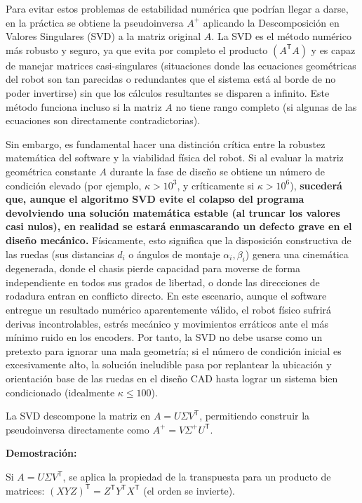 \documentclass[11pt,a4paper]{article}
\newcommand{\trans}{\mathsf{T}}      %
\begin{document}
Para evitar estos problemas de estabilidad numérica que podrían llegar a darse, en la práctica se obtiene la pseudoinversa \(A^+\) aplicando la Descomposición en Valores Singulares (SVD) a la matriz original \(A\). La SVD es el método numérico más robusto y seguro, ya que evita por completo el producto \((A^{\trans}A)\) y es capaz de manejar matrices casi-singulares (situaciones donde las ecuaciones geométricas del robot son tan parecidas o redundantes que el sistema está al borde de no poder invertirse) sin que los cálculos resultantes se disparen a infinito. Este método funciona incluso si la matriz \(A\) no tiene rango completo (si algunas de las ecuaciones son directamente contradictorias).

Sin embargo, es fundamental hacer una distinción crítica entre la robustez matemática del software y la viabilidad física del robot. Si al evaluar la matriz geométrica constante \(A\) durante la fase de diseño se obtiene un número de condición elevado (por ejemplo, \(\kappa > 10^3\), y críticamente si \(\kappa > 10^6\)), \textbf{sucederá que, aunque el algoritmo SVD evite el colapso del programa devolviendo una solución matemática estable (al truncar los valores casi nulos), en realidad se estará enmascarando un defecto grave en el diseño mecánico.} Físicamente, esto significa que la disposición constructiva de las ruedas (sus distancias \(d_i\) o ángulos de montaje \(\alpha_i, \beta_i\)) genera una cinemática degenerada, donde el chasis pierde capacidad para moverse de forma independiente en todos sus grados de libertad, o donde las direcciones de rodadura entran en conflicto directo. En este escenario, aunque el software entregue un resultado numérico aparentemente válido, el robot físico sufrirá derivas incontrolables, estrés mecánico y movimientos erráticos ante el más mínimo ruido en los encoders. Por tanto, la SVD no debe usarse como un pretexto para ignorar una mala geometría; si el número de condición inicial es excesivamente alto, la solución ineludible pasa por replantear la ubicación y orientación base de las ruedas en el diseño CAD hasta lograr un sistema bien condicionado (idealmente \(\kappa \le 100\)).

La SVD descompone la matriz en \(A = U \Sigma V^{\trans}\), permitiendo construir la pseudoinversa directamente como \(A^+ = V \Sigma^+ U^{\trans}\).

\textbf{Demostración:}

Si \(A = U \Sigma V^{\trans}\), se aplica la propiedad de la transpuesta para un producto de matrices: \((X Y Z)^{\trans} = Z^{\trans} Y^{\trans} X^{\trans}\) (el orden se invierte).
\end{document}
